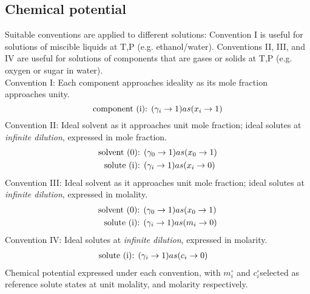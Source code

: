 \documentclass[onecolumn]{article}
\begin{document}
\subsection{Chemical potential \cite{Denbigh1968} }
\label{subsec:chemical_potential}
Suitable conventions are applied to different solutions: Convention I is useful for solutions of miscible liquids at T,P (e.g. ethanol/water). Conventions II, III, and IV are useful for solutions of components that are gases or solids at T,P (e.g. oxygen or sugar in water). \\
Convention I: Each component approaches ideality as its mole fraction approaches unity.
\begin{equation}
\textnormal{component (i): } (\gamma_i \rightarrow 1) as  (x_i \rightarrow 1)\\
\end{equation}
Convention II: Ideal solvent as it approaches unit mole fraction; ideal solutes at \textit{infinite dilution}, expressed in mole fraction.\\
\begin{equation}
\begin{aligned}
\textnormal{solvent (0): } & (\gamma_0 \rightarrow 1) as  (x_0 \rightarrow 1)\\
\textnormal{solute (i): } & (\gamma_i \rightarrow 1) as (x_i \rightarrow 0)
\end{aligned}
\end{equation}
Convention III: Ideal solvent as it approaches unit mole fraction; ideal solutes at \textit{infinite dilution}, expressed in molality. \\
\begin{equation}
\begin{aligned}
\textnormal{solvent (0): } & (\gamma_0 \rightarrow 1) as  (x_0 \rightarrow 1)\\
\textnormal{solute (i): } & (\gamma_i \rightarrow 1) as (m_i \rightarrow 0)
\end{aligned}
\end{equation}
Convention IV: Ideal solutes at \textit{infinite dilution}, expressed in molarity. \\
\begin{equation}
\begin{aligned}
\textnormal{solute (i): } & (\gamma_i \rightarrow 1) as (c_i \rightarrow 0)
\end{aligned}
\end{equation}
Chemical potential expressed under each convention, with $m_i^{\circ}$ and $c_i^{\circ}$selected as reference solute states at unit molality, and molarity respectively.
\end{document}
